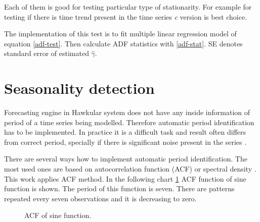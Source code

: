     Each of them is good for testing particular type of stationarity. For example for testing if there is time trend
    present in the time series \emph{c} version is best choice.

    The implementation of this test is to fit multiple linear regression model of equation \ref{adf-test}. Then
    calculate ADF statistics with \ref{adf-stat}. SE denotes standard error of estimated $\hat{\gamma}$.

    \section{Seasonality detection}
    Forecasting engine in Hawkular system does not have any inside information of period of a time series being
    modelled. Therefore automatic period identification has to be implemented. In practice it is
    a difficult task and result often differs from correct period, specially if there is significant noise present in
    the series \cite{period-meteo}.

    There are several ways how to implement automatic period identification. The most used ones are based on
    autocorrelation function (ACF) or spectral density \cite{period-hydman}. This work applies ACF method.
    In the following chart \ref{img:period-acf} ACF function of sine function is shown. The period of this
    function is seven. There are patterns repeated every seven observations and it is decreasing to zero.

    \begin{figure}[H]
        \begin{center}
            \caption{ACF of sine function.}
            \label{img:period-acf}
        \end{center}
    \end{figure}

